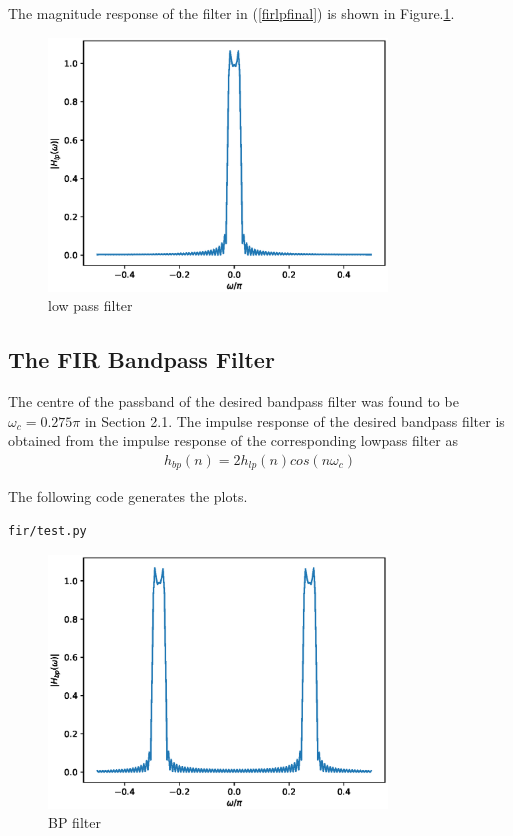 \documentclass[journal,12pt,twocolumn]{IEEEtran}
\begin{document}
The magnitude  response of the filter in (\ref{firlpfinal}) is shown in Figure.\ref{fig:fir_lowpass}.
\begin{figure}
    \centering
    \includegraphics[width = 9cm]{./figure/fir/fir_lowpass.eps}
    \caption{low pass filter}
    \label{fig:fir_lowpass}
\end{figure}
\subsection{The FIR Bandpass Filter}
The centre of the passband of the desired bandpass filter was found to be $\omega_c = 0.275\pi$ in Section
2.1.  The impulse response of the desired bandpass filter is obtained from the impulse response of the
corresponding lowpass filter as
\begin{eqnarray}
h_{bp}(n) = 2h_{lp}(n)cos(n\omega_c)
\end{eqnarray}

The following code generates the plots.
\begin{lstlisting}
fir/test.py
\end{lstlisting}
\begin{figure}
    \centering
    \includegraphics[width = 9cm]{./figure/fir/fir_bandpass.eps}
    \caption{BP filter}

    \label{fig:fir_bandpass}
\end{figure}
\end{document}
